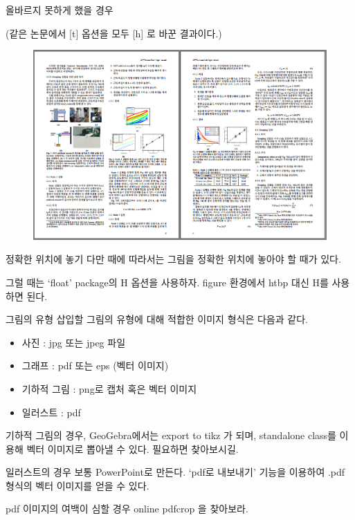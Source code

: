 \documentclass[12pt]{beamer}
\begin{document}
\begin{frame}{올바르지 못하게 했을 경우}
	
	{\small (같은 논문에서 [t] 옵션을 모두 [h] 로 바꾼 결과이다.)}
	\begin{figure}[h]
		\centering
		\includegraphics[width=.9\textwidth]{wrong_fig_v2.png}
	\end{figure}
\end{frame}
\begin{frame}{정확한 위치에 놓기}
	다만 때에 따라서는 그림을 정확한 위치에 놓아야 할 때가 있다.
	
	그럴 때는 `float' package의 H 옵션을 사용하자. figure 환경에서 htbp 대신 H를 사용하면 된다.
\end{frame}
\begin{frame}{그림의 유형}
	삽입할 그림의 유형에 대해 적합한 이미지 형식은 다음과 같다.
	\begin{itemize}
		\item 사진 : jpg 또는 jpeg 파일
		\item 그래프 : pdf 또는 eps (벡터 이미지)
		\item 기하적 그림 : png로 캡처 혹은 벡터 이미지
		\item 일러스트 : pdf
	\end{itemize}
	\begin{footnotesize}
		기하적 그림의 경우, GeoGebra에서는 export to tikz 가 되며, standalone class를 이용해 벡터 이미지로 뽑아낼 수 있다. 필요하면 찾아보시길.
		
		일러스트의 경우 보통 PowerPoint로 만든다. `pdf로 내보내기' 기능을 이용하여 .pdf 형식의 벡터 이미지를 얻을 수 있다.
		
		pdf 이미지의 여백이 심할 경우 online pdfcrop 을 찾아보라.
	\end{footnotesize}
\end{frame}
\end{document}
